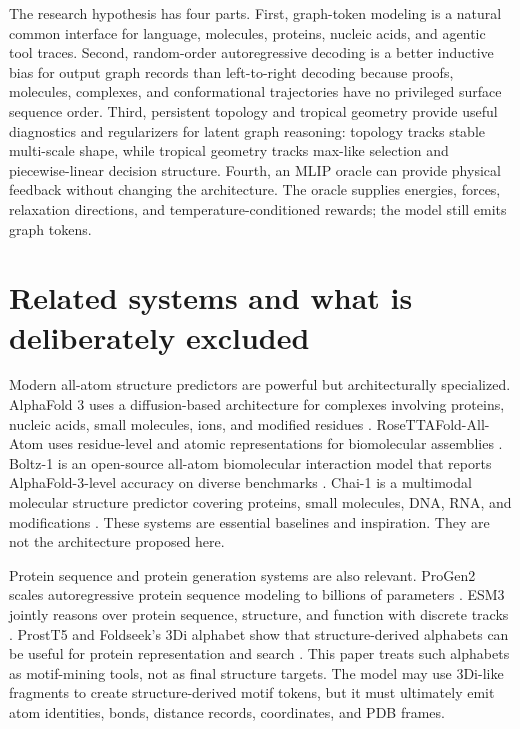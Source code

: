 \documentclass[11pt]{article}
\newcommand{\1}{\mathbf{1}}
\begin{document}
The research hypothesis has four parts. First, graph-token modeling is a natural common interface for language, molecules, proteins, nucleic acids, and agentic tool traces. Second, random-order autoregressive decoding is a better inductive bias for output graph records than left-to-right decoding because proofs, molecules, complexes, and conformational trajectories have no privileged surface sequence order. Third, persistent topology and tropical geometry provide useful diagnostics and regularizers for latent graph reasoning: topology tracks stable multi-scale shape, while tropical geometry tracks max-like selection and piecewise-linear decision structure. Fourth, an MLIP oracle can provide physical feedback without changing the architecture. The oracle supplies energies, forces, relaxation directions, and temperature-conditioned rewards; the model still emits graph tokens.

\section{Related systems and what is deliberately excluded}

Modern all-atom structure predictors are powerful but architecturally specialized. AlphaFold 3 uses a diffusion-based architecture for complexes involving proteins, nucleic acids, small molecules, ions, and modified residues \cite{AbramsonAF3_2024}. RoseTTAFold-All-Atom uses residue-level and atomic representations for biomolecular assemblies \cite{KrishnaRFAA2024}. Boltz-1 is an open-source all-atom biomolecular interaction model that reports AlphaFold-3-level accuracy on diverse benchmarks \cite{WohlwendBoltz2025}. Chai-1 is a multimodal molecular structure predictor covering proteins, small molecules, DNA, RNA, and modifications \cite{BoitreaudChai2024,ChaiLab2024}. These systems are essential baselines and inspiration. They are not the architecture proposed here.

Protein sequence and protein generation systems are also relevant. ProGen2 scales autoregressive protein sequence modeling to billions of parameters \cite{NijkampProGen2_2023}. ESM3 jointly reasons over protein sequence, structure, and function with discrete tracks \cite{HayesESM3_2025}. ProstT5 and Foldseek's 3Di alphabet show that structure-derived alphabets can be useful for protein representation and search \cite{HeinzingerProstT5_2023,VanKempenFoldseek2024}. This paper treats such alphabets as motif-mining tools, not as final structure targets. The model may use 3Di-like fragments to create structure-derived motif tokens, but it must ultimately emit atom identities, bonds, distance records, coordinates, and PDB frames.
\end{document}
